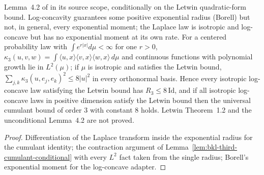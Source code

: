 \begin{lemma}
  \label{lem:bkl-local-third-cumulant}
  \leanok
  Lemma~4.2 of \cite{BizeulKlartagLehec2026} in its source scope, conditionally on the Letwin
  quadratic-form bound.  Log-concavity guarantees some positive exponential radius (Borell) but not, in general,
  every exponential moment; the Laplace law is isotropic and log-concave but has no exponential moment at
  its own rate.  For a centered probability law with $\int e^{r|x|}d\mu<\infty$ for one $r>0$,
  $\kappa_3(u,v,w)=\int\langle u,x\rangle\langle v,x\rangle\langle w,x\rangle\,d\mu$ and continuous
  functions with polynomial growth lie in $L^2(\mu)$; if $\mu$ is isotropic and satisfies the Letwin
  bound, $\sum_{j,k}\kappa_3(u,e_j,e_k)^2\le 8|u|^2$ in every orthonormal basis.  Hence every isotropic
  log-concave law satisfying the Letwin bound has $R_3\le 8\,\mathrm{Id}$, and if all isotropic
  log-concave laws in positive dimension satisfy the Letwin bound then the universal cumulant bound of
  order $3$ with constant $8$ holds.  Letwin Theorem~1.2 and the unconditional Lemma~4.2 are not proved.
\end{lemma}
\begin{proof}
  \leanok
  Differentiation of the Laplace transform inside the exponential radius for the cumulant identity;
  the contraction argument of Lemma~\ref{lem:bkl-third-cumulant-conditional} with every $L^2$ fact
  taken from the single radius; Borell's exponential moment for the log-concave adapter.
\end{proof}

